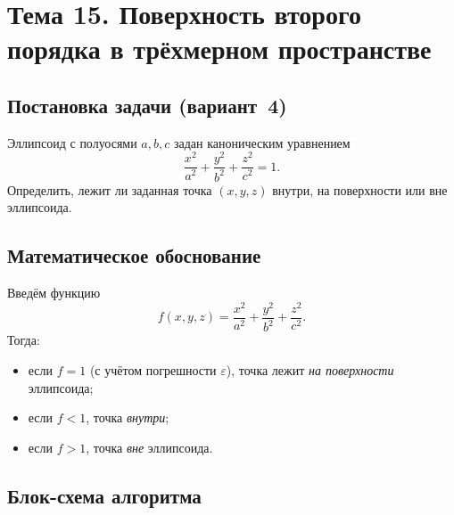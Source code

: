 \section{Тема 15. Поверхность второго порядка в трёхмерном пространстве}

\subsection{Постановка задачи (вариант~4)}

Эллипсоид с полуосями $a,b,c$ задан каноническим уравнением
\[
  \frac{x^2}{a^2}+\frac{y^2}{b^2}+\frac{z^2}{c^2}=1.
\]
Определить, лежит ли заданная точка $(x,y,z)$ внутри, на
поверхности или вне эллипсоида.

\subsection{Математическое обоснование}

Введём функцию
\[
  f(x,y,z) = \frac{x^2}{a^2}+\frac{y^2}{b^2}+\frac{z^2}{c^2}.
\]
Тогда:
\begin{itemize}
  \item если $f=1$ (с учётом погрешности $\varepsilon$), точка
        лежит \emph{на поверхности} эллипсоида;
  \item если $f<1$, точка \emph{внутри};
  \item если $f>1$, точка \emph{вне} эллипсоида.
\end{itemize}

\subsection{Блок-схема алгоритма}

